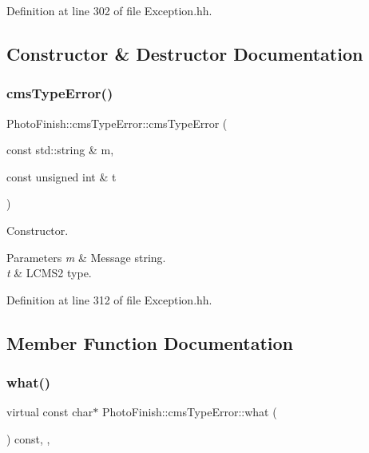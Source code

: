Definition at line 302 of file Exception.\+hh.



\subsection{Constructor \& Destructor Documentation}
\mbox{\label{class_photo_finish_1_1cms_type_error_a6f4392869288e257455f8298f881146c}} 
\subsubsection{\texorpdfstring{cms\+Type\+Error()}{cmsTypeError()}}
{\footnotesize\ttfamily Photo\+Finish\+::cms\+Type\+Error\+::cms\+Type\+Error (\begin{DoxyParamCaption}\item[{const std\+::string \&}]{m,  }\item[{const unsigned int \&}]{t }\end{DoxyParamCaption})\hspace{0.3cm}{\ttfamily [inline]}}



Constructor. 


\begin{DoxyParams}{Parameters}
{\em m} & Message string. \\
\hline
{\em t} & L\+C\+M\+S2 type. \\
\hline
\end{DoxyParams}


Definition at line 312 of file Exception.\+hh.



\subsection{Member Function Documentation}
\mbox{\label{class_photo_finish_1_1cms_type_error_adac46d245427925e3984a551bee3e1b4}} 
\subsubsection{\texorpdfstring{what()}{what()}}
{\footnotesize\ttfamily virtual const char$\ast$ Photo\+Finish\+::cms\+Type\+Error\+::what (\begin{DoxyParamCaption}{ }\end{DoxyParamCaption}) const\hspace{0.3cm}{\ttfamily [inline]}, {\ttfamily [virtual]}, {\ttfamily [noexcept]}}



